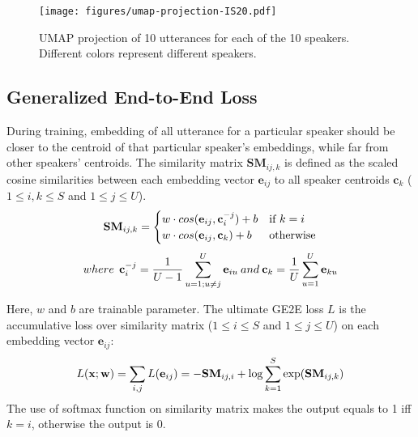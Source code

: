 \documentclass[a4paper]{article}
\begin{document}
\begin{figure}[h!]
  \begin{center}
  \vspace{-2mm}
    \texttt{[image: figures/umap-projection-IS20.pdf]}
  \end{center}
  \vspace{-6mm}
  \caption{\small UMAP projection of 10 utterances for each of the 10 speakers. Different colors represent different speakers.}
  \vspace{-6mm}
  \label{umap}
\end{figure}

\subsection{Generalized End-to-End Loss}
During training, embedding of all utterance for a particular speaker should be closer to the centroid of that particular speaker’s embeddings, while far from other speakers’ centroids. The similarity matrix $\mathbf{SM}_{ij,k}$ is defined as the scaled cosine similarities between each embedding vector $\mathbf{e}_{ij}$ to all speaker centroids $\mathbf{c}_{k}$ ($1 \leq i,k \leq S$ and $1\leq j \leq U$).
\vspace{-2mm}
\[\vspace{-2mm}
    \mathbf{SM}_{ij,k} =
\begin{cases}
    w \cdot cos(\mathbf{e}_{ij},\mathbf{c}_{i}^{-j}) + b  & \text{if } k = i\\
    w \cdot cos(\mathbf{e}_{ij},\mathbf{c}_{k}) + b   & \text{otherwise}
\end{cases}
\]
\[\vspace{-1.5mm}
    where \: \: \mathbf{c}_{i}^{-j} = \frac{1}{U-1}\displaystyle\sum_{u=1;u \neq j}^U \mathbf{e}_{iu} \: and \: \mathbf{c}_{k} = \frac{1}{U}\displaystyle\sum_{u=1}^U \mathbf{e}_{ku}
\]

Here, $w$ and $b$ are trainable parameter. The ultimate GE2E loss $L$ is the accumulative loss over similarity matrix ($1 \leq i \leq S$ and $1\leq j \leq U$) on each embedding vector $\mathbf{e}_{ij}$:
\vspace{-4mm}
\[\vspace{-1.7mm}
    L(\mathbf{x};\mathbf{w}) = \displaystyle\sum_{i,j} L(\mathbf{e}_{ij}) = - \mathbf{SM}_{ij,i} + \log \displaystyle\sum_{k=1}^{S} \exp(\mathbf{SM}_{ij,k})
\]
The use of softmax function on similarity matrix makes the output equals to 1 iff $k = i$, otherwise the output is 0.
\end{document}

